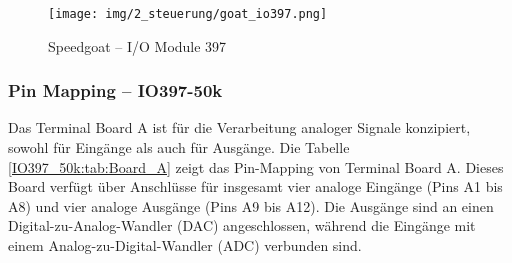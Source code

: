 \pagebreak[1]
\begin{figure}[!ht]
	\begin{center}
		\texttt{[image: img/2\_steuerung/goat\_io397.png]}
		\caption{Speedgoat – I/O Module 397 \cite{speedgoat:IO397_50k}}
		\label{IO397_50k:img:Module}
	\end{center}
\end{figure}
\pagebreak[1]

\subsubsection{Pin Mapping – IO397-50k}


Das Terminal Board A ist für die Verarbeitung analoger Signale konzipiert, sowohl für Eingänge als auch für Ausgänge. Die Tabelle \ref{IO397_50k:tab:Board_A} zeigt das Pin-Mapping von Terminal Board A. Dieses Board verfügt über Anschlüsse für insgesamt vier analoge Eingänge (Pins A1 bis A8) und vier analoge Ausgänge (Pins A9 bis A12). Die Ausgänge sind an einen Digital-zu-Analog-Wandler (DAC) angeschlossen, während die Eingänge mit einem Analog-zu-Digital-Wandler (ADC) verbunden sind.

